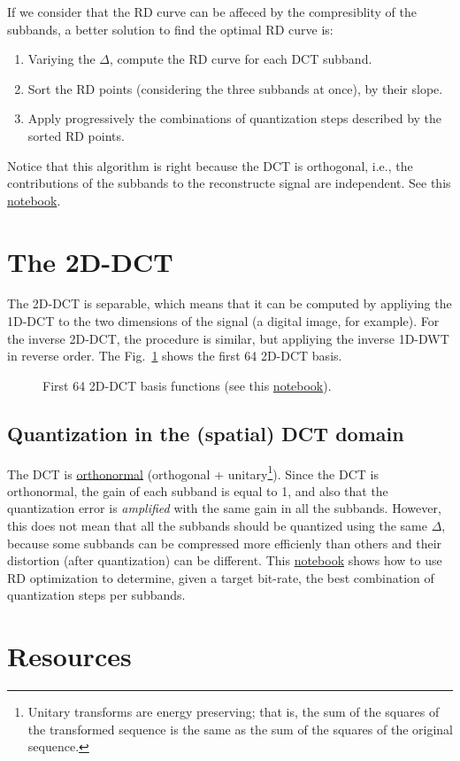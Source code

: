 If we consider that the RD curve can be affeced by the compresiblity of the subbands, a better solution to find the optimal RD curve is:
\begin{enumerate}
\item Variying the $\Delta$, compute the RD curve for each DCT
  subband.
\item Sort the RD points (considering the three subbands at once), by
  their slope.
\item Apply progressively the combinations of quantization steps
  described by the sorted RD points.
\end{enumerate}
Notice that this algorithm is right because the DCT is orthogonal,
i.e., the contributions of the subbands to the reconstructe signal are
independent. See this \href{https://github.com/Sistemas-Multimedia/Sistemas-Multimedia.github.io/blob/master/study_guide/06-color_transform/color-DCT_compression.ipynb}{notebook}. %

\section{The 2D-DCT}

The 2D-DCT is separable, which means that it can be computed by
appliying the 1D-DCT to the two dimensions of the signal (a digital
image, for example). For the inverse 2D-DCT, the procedure is similar,
but appliying the inverse 1D-DWT in reverse order. The
Fig.~\ref{fig:2D-DCT_basis} shows the first 64 2D-DCT basis.

\begin{figure}
  \centering {} \caption{First 64 2D-DCT basis
  functions (see this
\href{https://github.com/Sistemas-Multimedia/Sistemas-Multimedia.github.io/blob/master/milestones/07-DCT/DCT_basis.ipynb}{notebook}).} %
  \label{fig:2D-DCT_basis}
\end{figure}

\subsection{Quantization in the (spatial) DCT domain}

The DCT is
\href{https://en.wikipedia.org/wiki/Orthonormality}{orthonormal}
(orthogonal + unitary\footnote{Unitary transforms are energy
preserving; that is, the sum of the squares of the transformed
sequence is the same as the sum of the squares of the original
sequence.}). Since the DCT is orthonormal, the gain of each subband is
equal to 1, and also that the quantization error is \emph{amplified}
with the same gain in all the subbands. However, this does not mean
that all the subbands should be quantized using the same $\Delta$,
because some subbands can be compressed more efficienly than others
and their distortion (after quantization) can be different. This
\href{https://github.com/Sistemas-Multimedia/Sistemas-Multimedia.github.io/blob/master/milestones/07-DCT/block_DCT_compression.ipynb}{notebook}
shows how to use RD optimization to determine, given a target
bit-rate, the best combination of quantization steps per subbands.

\section{Resources}

\renewcommand{\addcontentsline}[3]{}%

